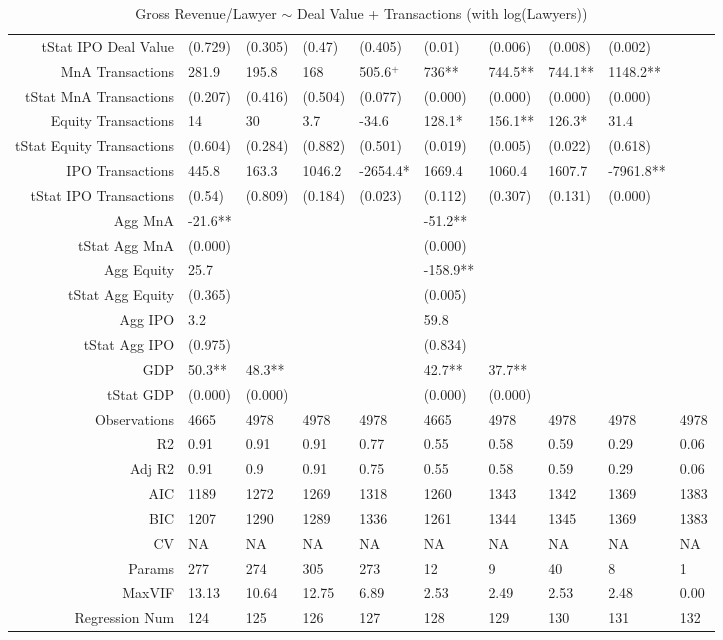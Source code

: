 \begin{table}[ht]
\begin{tabular}{rlllllllll}
  tStat IPO Deal Value & (0.729) & (0.305) & (0.47) & (0.405) & (0.01) & (0.006) & (0.008) & (0.002) &  \\ 
  MnA Transactions & 281.9 & 195.8 & 168 & 505.6$^{+}$ & 736** & 744.5** & 744.1** & 1148.2** &  \\ 
  tStat MnA Transactions & (0.207) & (0.416) & (0.504) & (0.077) & (0.000) & (0.000) & (0.000) & (0.000) &  \\ 
  Equity Transactions & 14 & 30 & 3.7 & -34.6 & 128.1* & 156.1** & 126.3* & 31.4 &  \\ 
  tStat Equity Transactions & (0.604) & (0.284) & (0.882) & (0.501) & (0.019) & (0.005) & (0.022) & (0.618) &  \\ 
  IPO Transactions & 445.8 & 163.3 & 1046.2 & -2654.4* & 1669.4 & 1060.4 & 1607.7 & -7961.8** &  \\ 
  tStat IPO Transactions & (0.54) & (0.809) & (0.184) & (0.023) & (0.112) & (0.307) & (0.131) & (0.000) &  \\ 
  Agg MnA & -21.6** &  &  &  & -51.2** &  &  &  &  \\ 
  tStat Agg MnA & (0.000) &  &  &  & (0.000) &  &  &  &  \\ 
  Agg Equity & 25.7 &  &  &  & -158.9** &  &  &  &  \\ 
  tStat Agg Equity & (0.365) &  &  &  & (0.005) &  &  &  &  \\ 
  Agg IPO & 3.2 &  &  &  & 59.8 &  &  &  &  \\ 
  tStat Agg IPO & (0.975) &  &  &  & (0.834) &  &  &  &  \\ 
  GDP & 50.3** & 48.3** &  &  & 42.7** & 37.7** &  &  &  \\ 
  tStat GDP & (0.000) & (0.000) &  &  & (0.000) & (0.000) &  &  &  \\ 
  Observations & 4665 & 4978 & 4978 & 4978 & 4665 & 4978 & 4978 & 4978 & 4978 \\ 
  R2 & 0.91 & 0.91 & 0.91 & 0.77 & 0.55 & 0.58 & 0.59 & 0.29 & 0.06 \\ 
  Adj R2 & 0.91 & 0.9 & 0.91 & 0.75 & 0.55 & 0.58 & 0.59 & 0.29 & 0.06 \\ 
  AIC & 1189 & 1272 & 1269 & 1318 & 1260 & 1343 & 1342 & 1369 & 1383 \\ 
  BIC & 1207 & 1290 & 1289 & 1336 & 1261 & 1344 & 1345 & 1369 & 1383 \\ 
  CV & NA & NA & NA & NA & NA & NA & NA & NA & NA \\ 
  Params & 277 & 274 & 305 & 273 & 12 & 9 & 40 & 8 & 1 \\ 
  MaxVIF & 13.13 & 10.64 & 12.75 & 6.89 & 2.53 & 2.49 & 2.53 & 2.48 & 0.00 \\ 
  Regression Num & 124 & 125 & 126 & 127 & 128 & 129 & 130 & 131 & 132 \\ 
   \hline
\end{tabular}
\caption{Gross Revenue/Lawyer $\sim$ Deal Value + Transactions (with log(Lawyers))} 
\end{table}
